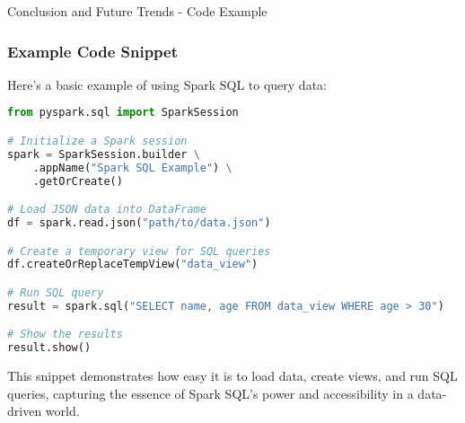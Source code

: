 \documentclass[aspectratio=169]{beamer}
\begin{document}
\begin{frame}[fragile]{Conclusion and Future Trends - Code Example}
    \frametitle{Example Code Snippet}
    Here’s a basic example of using Spark SQL to query data:
    
    \begin{lstlisting}[language=Python]
from pyspark.sql import SparkSession

# Initialize a Spark session
spark = SparkSession.builder \
    .appName("Spark SQL Example") \
    .getOrCreate()

# Load JSON data into DataFrame
df = spark.read.json("path/to/data.json")

# Create a temporary view for SQL queries
df.createOrReplaceTempView("data_view")

# Run SQL query
result = spark.sql("SELECT name, age FROM data_view WHERE age > 30")

# Show the results
result.show()
    \end{lstlisting}
    
    This snippet demonstrates how easy it is to load data, create views, and run SQL queries, capturing the essence of Spark SQL's power and accessibility in a data-driven world.
\end{frame}
\end{document}
